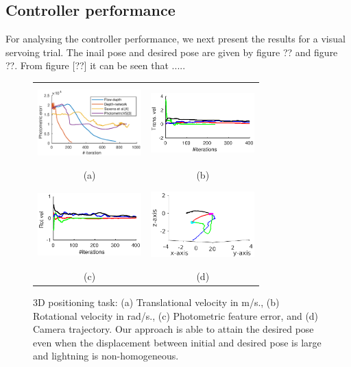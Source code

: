 \documentclass[letterpaper, 10 pt, conference]{ieeeconf}  %
\begin{document}
\subsection{Controller performance}
For analysing the controller performance, we next present the results for a visual servoing trial. The inail pose and desired pose are given by figure {??} and figure {??}. From figure [??] it can be seen that .....

\begin{figure}
\centering
\begin{tabular}{cc}

\includegraphics[width=4cm, height=3cm]{Plots/Photo_all.eps} &
\includegraphics[width=4cm, height=3cm]{Plots/tvel_all.eps} \\
(a) & (b) \\
\includegraphics[width=4cm, height=3cm]{Plots/rvel_all.eps} &
\includegraphics[width=4cm, height=3cm]{Plots/traj_all.eps}\\
(c) & (d)
\end{tabular}
\caption[3D positioning task]{3D positioning task:
(a)  Translational velocity in m/s.,
(b) Rotational velocity in rad/s.,
(c) Photometric feature error, and
(d) Camera trajectory. Our
approach is able to attain the desired pose even when the displacement
between initial and desired pose is large and lightning is non-homogeneous. }
\label{fig:ex3}%
\end{figure}
\end{document}
